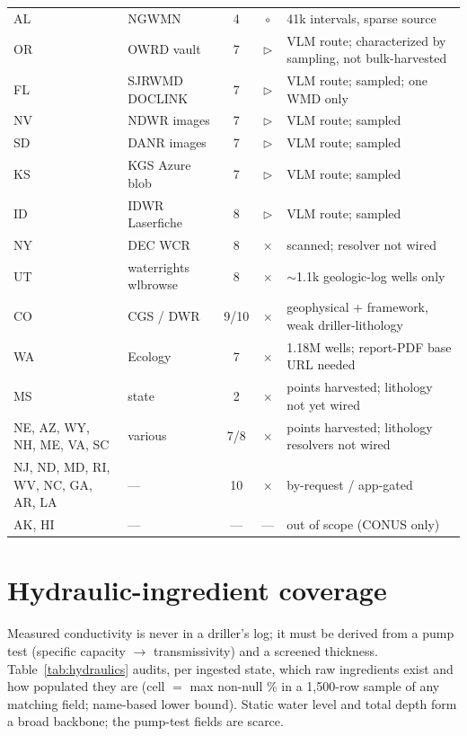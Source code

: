 \documentclass[12pt]{article}
\begin{document}
\begin{longtable}{L{0.085\textwidth} L{0.17\textwidth} c c L{0.40\textwidth}}
AL & NGWMN & 4 & $\circ$ & 41k intervals, sparse source \\
OR & OWRD vault & 7 & $\triangleright$ & VLM route; characterized by sampling, not bulk-harvested \\
FL & SJRWMD DOCLINK & 7 & $\triangleright$ & VLM route; sampled; one WMD only \\
NV & NDWR images & 7 & $\triangleright$ & VLM route; sampled \\
SD & DANR images & 7 & $\triangleright$ & VLM route; sampled \\
KS & KGS Azure blob & 7 & $\triangleright$ & VLM route; sampled \\
ID & IDWR Laserfiche & 8 & $\triangleright$ & VLM route; sampled \\
NY & DEC WCR & 8 & $\times$ & scanned; resolver not wired \\
UT & waterrights wlbrowse & 8 & $\times$ & $\sim$1.1k geologic-log wells only \\
CO & CGS / DWR & 9/10 & $\times$ & geophysical + framework, weak driller-lithology \\
WA & Ecology & 7 & $\times$ & 1.18M wells; report-PDF base URL needed \\
MS & state & 2 & $\times$ & points harvested; lithology not yet wired \\
NE, AZ, WY, NH, ME, VA, SC & various & 7/8 & $\times$ & points harvested; lithology resolvers not wired \\
NJ, ND, MD, RI, WV, NC, GA, AR, LA & --- & 10 & $\times$ & by-request / app-gated \\
AK, HI & --- & --- & --- & out of scope (CONUS only) \\
\bottomrule
\end{longtable}
\normalsize

\section{Hydraulic-ingredient coverage}
Measured conductivity is never in a driller's log; it must be derived from a pump test (specific capacity
$\rightarrow$ transmissivity) and a screened thickness. Table~\ref{tab:hydraulics} audits, per ingested
state, which raw ingredients exist and how populated they are (cell $=$ max non-null \% in a 1{,}500-row
sample of any matching field; name-based lower bound). Static water level and total depth form a broad
backbone; the pump-test fields are scarce.
\end{document}
